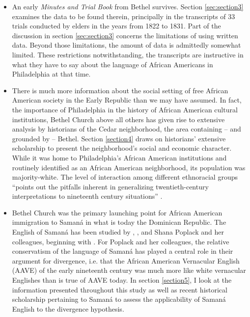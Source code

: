 \documentclass[output=paper,colorlinks,citecolor=brown]{langscibook}
\begin{document}
\begin{itemize}
\item  
An early \textit{Minutes and Trial Book} from Bethel survives. Section \ref{sec:section3} examines the data to be found therein, principally in the transcripts of 33 trials conducted by elders in the years from 1822 to 1831. Part of the discussion in section \ref{sec:section3} concerns the limitations of using written data. Beyond those limitations, the amount of data is admittedly somewhat limited. These restrictions notwithstanding, the transcripts are instructive in what they have to say about the language of African Americans in Philadelphia at that time.
 
\item  
There is much more information about the social setting of free African American society in the Early Republic than we may have assumed. In fact, the importance of Philadelphia in the history of African American cultural institutions, Bethel Church above all others has given rise to extensive analysis by historians of the Cedar neighborhood, the area containing -- and grounded by -- Bethel. Section \ref{section4} draws on historians’ extensive scholarship to present the neighborhood’s social and economic character. While it was home to Philadelphia’s African American institutions and routinely identified as an African American neighborhood, its population was majority-white. The level of interaction among different ethnoracial groups “points out the pitfalls inherent in generalizing twentieth-century interpretations to nineteenth century situations” \citep[277]{Lapsansky1975}.
 
\item  
Bethel Church was the primary launching point for African American immigration to Samaná in what is today the Dominican Republic. The English of Samaná has been studied by \citealt{DeBose1983}, \citealt{Hannah1997}, and Shana Poplack and her colleagues, beginning with \citealt{PoplackSankoff1987}. For Poplack and her colleagues, the relative conservatism of the language of Samaná has played a central role in their argument for divergence, i.e. that the African American Vernacular English (AAVE) of the early nineteenth century was much more like white vernacular Englishes than is true of AAVE today. In section \ref{section5}, I look at the information presented throughout this study as well as recent historical scholarship pertaining to Samaná to assess the applicability of Samaná English to the divergence hypothesis.
 
\end{itemize}
 
\end{document}
